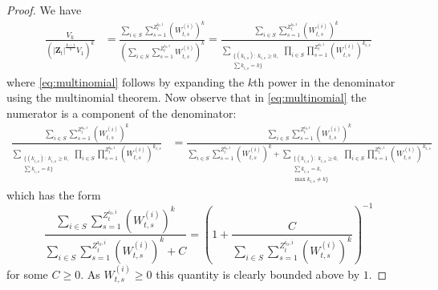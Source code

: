 \documentclass[preprint,3p,12pt]{elsarticle}
\theoremstyle{definition}
\newcommand{\z}[1][i_0, i]{Z_t^{#1}}
\newcommand{\V}[1]{V_{#1}}
\begin{document}
        \begin{proof}
          We have
    \begin{align}
    \frac{\V{k} }
    {(|\boldsymbol{Z}_t|^{\frac{k-1}{k}}\V{1})^k}
    &=  \frac{\sum_{i\in S}\sum_{s=1}^{\z} (W_{t,s}^{(i)})^k }
    {(\sum_{i\in S}\sum_{s=1}^{\z}W_{t,s}^{(i)})^k}
    = \frac{\sum_{i \in S}\sum_{s=1}^{\z} (W_{t,s}^{(i)})^k }
    {\sum_{\substack{\{(k_{i,s}):\: k_{i,s} \geq 0,\\\sum k_{i,s} = k\}}} \prod_{i \in S} \prod_{s=1}^{\z}(W_{t,s}^{(i)})^{k_{i,s}}}
    \label{eq:multinomial}
    \end{align}
    where \eqref{eq:multinomial} follows by expanding the $k$th power in the denominator using the multinomial theorem. Now observe that in \eqref{eq:multinomial} the numerator is a component of the denominator:
    \begin{align*}
      \frac{\sum_{i \in S}\sum_{s=1}^{\z} (W_{t,s}^{(i)})^k }
    {\sum_{\substack{\{(k_{i,s}):\: k_{i,s} \geq 0,\\\sum k_{i,s} = k\}}} \prod_{i \in S} \prod_{s=1}^{\z}(W_{t,s}^{(i)})^{k_{i,s}}}
    &= \frac{\sum_{i \in S}\sum_{s=1}^{\z} (W_{t,s}^{(i)})^k }
    {\sum_{i \in S}\sum_{s=1}^{\z} (W_{t,s}^{(i)})^k +\sum_{\substack{\{(k_{i,s}):\: k_{i,s} \geq 0,\\\sum k_{i,s} = k,\\ \max k_{i,s} \neq k\}}} \prod_{i \in S} \prod_{s=1}^{\z}(W_{t,s}^{(i)})^{k_{i,s}}}
    \end{align*}
    which has the form  
    \begin{equation*}
        \frac{\sum_{i \in S}\sum_{s=1}^{\z} (W_{t,s}^{(i)})^k }{\sum_{i \in S}\sum_{s=1}^{\z} (W_{t,s}^{(i)})^k  + C} = \left(1 + \frac{C}{\sum_{i \in S}\sum_{s=1}^{\z} (W_{t,s}^{(i)})^k} \right)^{-1}
    \end{equation*}
    for some $C \ge 0$. As $W_{t,s}^{(i)} \geq 0$ this quantity is clearly bounded above by $1$.
\end{proof}
\end{document}

